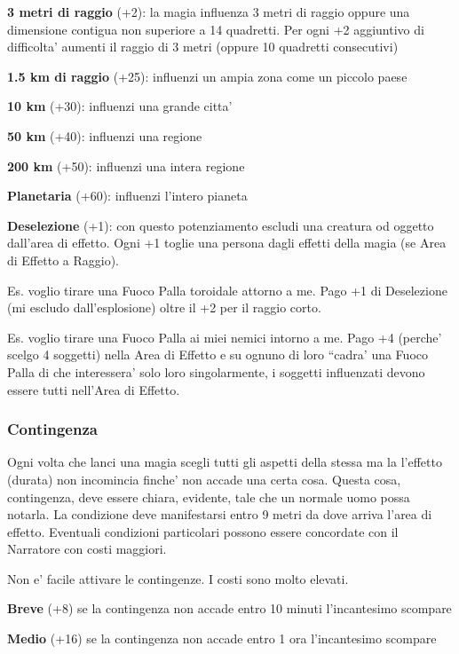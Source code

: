\documentclass[a4paper,11pt,twoside,openany]{dndbook}
\begin{document}
\textbf{3 metri di raggio} (+2): la magia influenza 3 metri di raggio oppure una dimensione contigua non superiore a 14 quadretti. Per ogni +2 aggiuntivo di difficolta' aumenti il raggio di 3 metri (oppure 10 quadretti consecutivi)

\textbf{1.5 km di raggio} (+25): influenzi un ampia zona come un piccolo paese

\textbf{10 km} (+30): influenzi una grande citta'

\textbf{50 km} (+40): influenzi una regione

\textbf{200 km} (+50): influenzi una intera regione

\textbf{Planetaria} (+60): influenzi l'intero pianeta

\textbf{Deselezione} (+1): con questo potenziamento escludi una creatura od oggetto dall'area di effetto. Ogni +1 toglie una persona dagli effetti della magia (se Area di Effetto a Raggio).

Es. voglio tirare una Fuoco Palla toroidale attorno a me. Pago +1 di Deselezione (mi escludo dall'esplosione) oltre il +2 per il raggio corto.

Es. voglio tirare una Fuoco Palla ai miei nemici intorno a me. Pago +4 (perche' scelgo 4 soggetti) nella Area di Effetto e su ognuno di loro ``cadra' una Fuoco Palla di che interessera' solo loro singolarmente, i soggetti influenzati devono essere tutti nell'Area di Effetto.

\subsubsection{Contingenza}

\label{contingenza}

Ogni volta che lanci una magia scegli tutti gli aspetti della stessa ma la l'effetto (durata) non incomincia finche' non accade una certa cosa. Questa cosa, contingenza, deve essere chiara, evidente, tale che un normale uomo possa notarla. La condizione deve manifestarsi entro 9 metri da dove arriva l'area di effetto. Eventuali condizioni particolari possono essere concordate con il Narratore con costi maggiori. 

Non e' facile attivare le contingenze. I costi sono molto elevati.

\textbf{Breve} (+8) se la contingenza non accade entro 10 minuti l'incantesimo scompare

\textbf{Medio} (+16) se la contingenza non accade entro 1 ora l'incantesimo scompare
\end{document}
